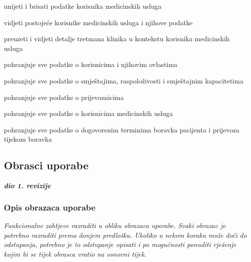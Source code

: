 \begin{packed_enum}
				\item  {}
				\begin{packed_enum}
					\item unijeti i brisati podatke korisnika medicinskih usluga
					\item vidjeti postojeće korisnike medicinskih usluga i njihove podatke
					\item preuzeti i vidjeti detalje tretmana klinika u kontekstu korisnika medicinskih usluga
				\end{packed_enum}
				
					\item  {}
				\begin{packed_enum}
					\item pohranjuje sve podatke o korisnicima i njihovim ovlastima
					\item pohranjuje sve podatke o smještajima, raspoloživosti i smještajnim kapacitetima
					\item pohranjuje sve podatke o prijevoznicima
					\item pohranjuje sve podatke o korisnicima medicinskih usluga
					\item pohranjuje sve podatke o dogovorenim terminima boravka pacijenta i prijevoza tijekom boravka
				\end{packed_enum}
			\end{packed_enum}
			\eject 
			
			
				
			\subsection{Obrasci uporabe}
				
				\textbf{\textit{dio 1. revizije}}
				
				\subsubsection{Opis obrazaca uporabe}
					\textit{Funkcionalne zahtjeve razraditi u obliku obrazaca uporabe. Svaki obrazac je potrebno razraditi prema donjem predlošku. Ukoliko u nekom koraku može doći do odstupanja, potrebno je to odstupanje opisati i po mogućnosti ponuditi rješenje kojim bi se tijek obrasca vratio na osnovni tijek.}\\
					

